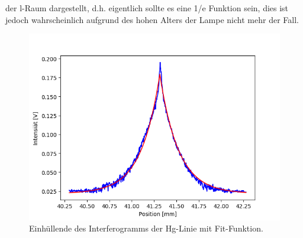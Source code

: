 der l-Raum dargestellt, d.h. eigentlich sollte es eine 1/e Funktion sein, dies ist jedoch wahrscheinlich aufgrund des hohen Alters der Lampe
nicht mehr der Fall.
\begin{figure}[h]
    \centering
    \includegraphics[scale=0.8]{Bilder/Anna/fithigh.png}
    \caption{Einhüllende des Interferogramms der Hg-Linie mit Fit-Funktion.}
    \label{fig:fithigh}
\end{figure}
\newpage